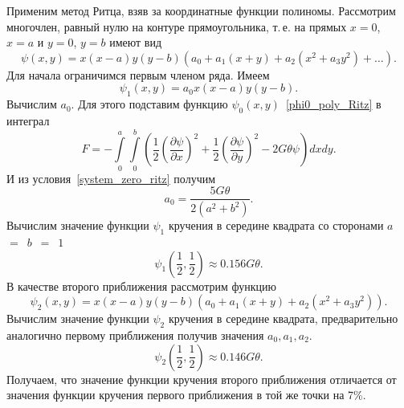 \documentclass[12pt, a4paper]{article}
\begin{document}
Применим метод Ритца, взяв за координатные функции полиномы.
Рассмотрим многочлен, равный нулю на контуре прямоугольника, т.\,е. на прямых $x = 0$, $x = a$  и $y = 0$, $y = b$ имеют вид
\[
	\psi(x, y) = x(x - a)y(y - b)\left(a_0 + a_1\left(x + y\right) + a_2\left(x^2 + a_3 y^2\right) + \ldots\right).
\]
Для начала ограничимся первым членом ряда. Имеем
\begin{equation}\label{phi0_poly_Ritz}
	\psi_1(x, y) = a_0 x(x - a)y(y - b).
\end{equation}
Вычислим $a_0$.
Для этого подставим функцию $\psi_0(x, y)$~\eqref{phi0_poly_Ritz} в интеграл 
\begin{equation}\label{phi0_int}
	F = - \int\limits_0^a \int\limits_0^b \left(
	\frac{1}{2}
	\left(\frac{\partial\psi}{\partial x}\right)^2 + 
	\frac{1}{2}
	\left(\frac{\partial\psi}{\partial y}\right)^2
	-2G\theta\psi
	 \right) dx dy.
\end{equation}
И из условия~\eqref{system_zero_ritz}
получим
\[
	a_0 = \frac{5 G \theta}{2(a^2 + b^2)}.
\]
Вычислим значение функции $\psi_1$ кручения в середине квадрата со сторонами $a$~$=$~$b$~$=$~$1$
\[
	\psi_1\left(\frac{1}{2}, \frac{1}{2}\right) \approx 0.156 G \theta.
\]
В качестве второго приближения рассмотрим функцию
\begin{equation}\label{u_3_poly_Ritz}
	\psi_2(x, y) = x(x - a)y(y - b)\left(a_0 + a_1\left(x + y\right) + a_2\left(x^2 + a_3 y^2\right)\right).
\end{equation}
Вычислим значение функции $\psi_2$ кручения в середине квадрата, предварительно аналогично первому приближения получив значения $a_0, a_1, a_2$.
\[
\psi_2\left(\frac{1}{2}, \frac{1}{2}\right) \approx 0.146 G \theta.
\]
Получаем, что значение функции кручения второго приближения отличается от значения функции кручения первого приближения в той же точки на 7\%.
\end{document}
